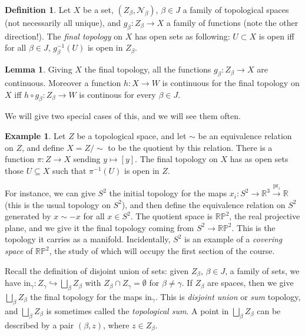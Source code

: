 \documentclass{tufte-handout}
\def\into {\hookrightarrow}
\def\cN {\mathcal{N}}
\def\RR{\mathbb{R}}
\DeclareMathOperator{\pr}{pr}
\theoremstyle{definition}
\newtheorem{lemma}{Lemma}
\newtheorem{definition}{Definition}
\newtheorem{example}{Example}
\begin{document}
\begin{definition} 
Let $X$ be a set, $(Z_\beta,\cN_\beta)$, $\beta \in J$ a family of topological spaces 
(not necessarily all unique), and $g_\beta\colon Z_\beta\to X$ a family of 
functions (note the other direction!). The \emph{final topology} on $X$ has open sets as 
following: $U\subset X$ is open iff for all $\beta\in J$, $g_\beta^{-1}(U)$ is open in 
$Z_\beta$. 
\end{definition}

\begin{lemma} 
Giving $X$ the final topology, all the functions $g_\beta\colon Z_\beta\to X$ 
are continuous. Moreover a function $h\colon X\to W$ is continuous for the final topology on 
$X$ iff $h\circ g_\beta\colon Z_\beta\to W$ is continous for every $\beta\in J$. 
\end{lemma}

We will give two special cases of this, and we will see them often.

\begin{example} 
Let $Z$ be a topological space, and let $\sim$ be an equivalence 
relation on $Z$, and define $X = Z/\!\sim$ to be the quotient by this relation. There is a 
function $ \pi\colon Z\to X$ sending $y\mapsto [y]$. The final topology on $X$ has as open 
sets those $U\subseteq X$ such that $\pi^{-1}(U)$ is open in $Z$. 
\end{example}

For instance, we can give $S^2$ the initial topology for the maps $x_i\colon S^2 \to \RR^3 
\xrightarrow{\pr_i} \RR$ (this is the usual topology on $S^2$), and then define the equivalence 
relation on $S^2$ generated by $x\sim -x$ for all $x\in S^2$. 
The quotient space is $\mathbb{RP}^2$, the real projective 
plane, and we give it the final topology coming from $S^2\to \mathbb{RP}^2$. This is the 
topology it carries as a manifold. Incidentally, $S^2$ is an example of a \emph{covering 
space} of $\mathbb{RP}^2$, the study of which will occupy the first section of the course.


Recall the definition of disjoint union of sets: given $Z_\beta$, 
 $\beta\in J$, a family of sets, we have $\mathrm{in}_\gamma \colon Z_\gamma \into 
 \bigsqcup_{\beta} Z_\beta$ with $Z_\beta \cap Z_\gamma = \emptyset$ for $\beta\neq \gamma$. 
 If $Z_\beta$ are spaces, then we give $\bigsqcup_{\beta} Z_\beta$ the final topology for 
 the maps $\mathrm{in}_\gamma$. This is \emph{disjoint union} or \emph{sum} 
topology, and $\bigsqcup_{\beta} Z_\beta$ is sometimes called the 
\emph{topological sum}. A point in $\bigsqcup_{\beta} Z_\beta$ can be described by a pair 
$(\beta,z)$, where $z \in Z_\beta$.
\end{document}
